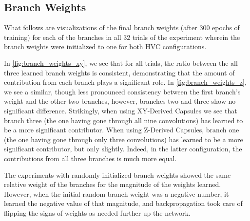 \documentclass{article}
\begin{document}
\subsection{Branch Weights}

What follows are visualizations of the final branch weights (after 300 epochs of training) for each of the branches in all 32 trials of the experiment wherein the branch weights were initialized to one for both HVC configurations.

In \autoref{fig:branch_weights_xy}, we see that for all trials, the ratio between the all three learned branch weights is consistent, demonstrating that the amount of contribution from each branch plays a significant role.  In \autoref{fig:branch_weights_z}, we see a similar, though less pronounced consistency between the first branch's weight and the other two branches, however, branches two and three show no significant difference.  Strikingly, when using XY-Derived Capsules we see that branch three (the one having gone through all nine convolutions) has learned to be a more significant contributor.  When using Z-Derived Capsules, branch one (the one having gone through only three convolutions) has learned to be a more significant contributor, but only slightly.  Indeed, in the latter configuration, the contributions from all three branches is much more equal.

The experiments with randomly initialized branch weights showed the same relative weight of the branches for the magnitude of the weights learned.  However, when the initial random branch weight was a negative number, it learned the negative value of that magnitude, and backpropagation took care of flipping the signs of weights as needed further up the network.
\end{document}

